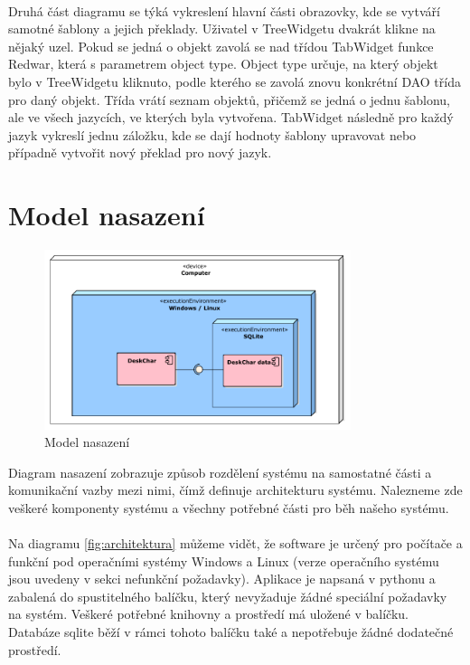 \documentclass[thesis=B,czech]{resources/FITthesis}[2012/06/26]
\begin{document}
\\
Druhá část diagramu se týká vykreslení hlavní části obrazovky, kde se vytváří samotné šablony a jejich překlady. Uživatel v TreeWidgetu dvakrát klikne na nějaký uzel. Pokud se jedná o objekt zavolá se nad třídou TabWidget funkce Redwar, která s parametrem object type. Object type určuje, na který objekt bylo v TreeWidgetu kliknuto, podle kterého se zavolá znovu konkrétní DAO třída pro daný objekt. Třída vrátí seznam objektů, přičemž se jedná o jednu šablonu, ale ve všech jazycích, ve kterých byla vytvořena. TabWidget následně pro každý jazyk vykreslí jednu záložku, kde se dají hodnoty šablony upravovat nebo případně vytvořit nový překlad pro nový jazyk.
	
	\section{Model nasazení}
	\begin{figure}\centering
	\includegraphics[width=0.8\textwidth]{images/model_nasazeni}
	\caption[Model nasazení]{Model nasazení}\label{fig:model_nasazeni}
	\end{figure}
Diagram nasazení zobrazuje způsob rozdělení systému na samostatné části a komunikační vazby mezi nimi, čímž definuje architekturu systému. Nalezneme zde veškeré komponenty systému a všechny potřebné části pro běh našeho systému.\\
\\
Na diagramu \ref{fig:architektura} můžeme vidět, že software je určený pro počítače a funkční pod operačními systémy Windows a Linux (verze operačního systému jsou uvedeny v sekci nefunkční požadavky). Aplikace je napsaná v pythonu a zabalená do spustitelného balíčku, který nevyžaduje žádné speciální požadavky na systém. Veškeré potřebné knihovny a prostředí má uložené v balíčku. Databáze sqlite běží v rámci tohoto balíčku také a nepotřebuje žádné dodatečné prostředí.
\end{document}
